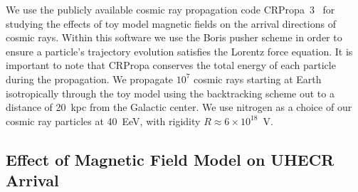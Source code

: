 \documentclass[usenatbib]{mnras}
\begin{document}
We use the publicly available cosmic ray propagation code CRPropa~3~\cite{CRPropa3_2016} for studying the effects of toy model magnetic fields on the arrival directions of cosmic rays. Within this software we use the Boris pusher scheme in order to ensure a particle's trajectory evolution satisfies the Lorentz force equation. It is important to note that CRPropa conserves the total energy of each particle during the propagation.
We propagate $10^7$ cosmic rays starting at Earth isotropically through the toy model using the backtracking scheme out to a distance of 20~kpc from the Galactic center. We use nitrogen as a choice of our cosmic ray particles at 40~EeV, with rigidity $R\approx 6 \times 10^{18}$~V. 

\subsection{Effect of Magnetic Field Model on UHECR Arrival}
\end{document}
